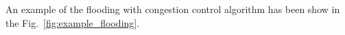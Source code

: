 An example of the flooding with congestion control algorithm has been
show in the Fig.~\ref{fig:example_flooding}.

\begin{comment}
In each round, peers check if a chunk have been received from the rest
of peers of the team (${\cal P}_k\in {\cal T}_j)$). If not, peers send
a $[\mathtt{propagate}~{\cal P}_i]$ to one or more (possibly
to the rest of) peers of the team, where ${\cal P}_i$ is the origin peer
of the missing chunk. At this point, the process continues as
described in Section~\ref{dbs:chunk_flooding}.
\end{comment}

\begin{comment}
For each ${\cal P}_k\in N({\cal P}_i)$, ${\cal P}_i$ checks if a chunk
has been received from ${\cal P}_k$. If ${\cal P}_i$ detects that
${\cal P}_k$ has not sent a chunk to it during $L$ consecutive rounds,
performs $N({\cal P}_i) = N({\cal P}_i)\setminus{\cal P}_k$, and stops
sending to ${\cal P}_k$ more chunks.
\end{comment}
\begin{comment}
computes a
``chunk-debt'', denoted by $d({\cal P}_k)$, that is incremented each
time a chunk is received from ${\cal P}_k$ and decremented each time a
chunk is sent to ${\cal P}_k$. If ${\cal P}_i$ verifies that $d({\cal
  P}_k)>D$ (the maximum debt), then ${\cal P}_i$ considers that ${\cal
  P}_k$ is unable to communicate with it, performs $N({\cal P}_i) =
N({\cal P}_i)\setminus{\cal P}_k$, and stops sending to ${\cal P}_k$
more chunks.
\end{comment}




